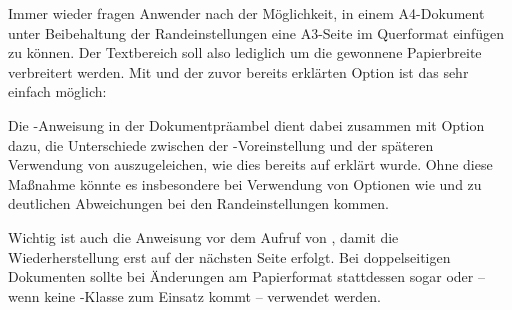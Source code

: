 \begin{Example}
  Immer wieder fragen Anwender nach der Möglichkeit, in einem A4-Dokument
  unter Beibehaltung der Randeinstellungen eine A3-Seite im Querformat
  einfügen zu können. Der Textbereich soll also lediglich um die gewonnene
  Papierbreite verbreitert werden. Mit 
   und der zuvor bereits erklärten Option
   ist das sehr einfach möglich:
  Die -Anweisung in der
  Dokumentpräambel dient dabei zusammen mit Option
  dazu, die Unterschiede zwischen der
  -Voreinstellung und der späteren Verwendung
  von  auszugeleichen, wie dies bereits auf
   erklärt wurde. Ohne diese
  Maßnahme könnte es insbesondere bei Verwendung von Optionen wie
   und
   zu deutlichen Abweichungen bei den
  Randeinstellungen kommen.
  
  Wichtig ist auch die Anweisung
   vor dem Aufruf von
  , damit die Wiederherstellung erst auf der
  nächsten Seite erfolgt. Bei doppelseitigen Dokumenten sollte bei Änderungen
  am Papierformat stattdessen sogar
   oder
  -- wenn keine \KOMAScript-Klasse zum Einsatz kommt --
   verwendet
  werden.%
\end{Example}

